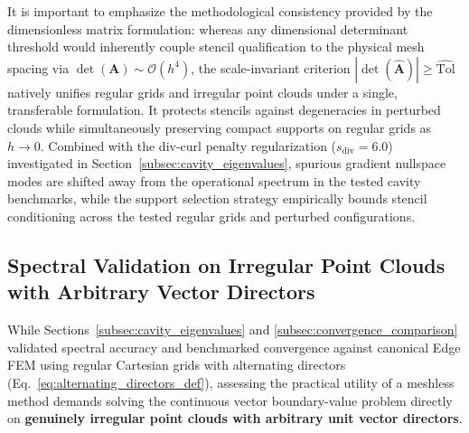 \documentclass[preprint,12pt]{elsarticle}
\begin{document}
It is important to emphasize the methodological consistency provided by the dimensionless matrix formulation: whereas any dimensional determinant threshold would inherently couple stencil qualification to the physical mesh spacing via $\det(\mathbf{A}) \sim \mathcal{O}(h^4)$, the scale-invariant criterion $|\det(\widehat{\mathbf{A}})| \ge \widehat{\mathrm{Tol}}$ natively unifies regular grids and irregular point clouds under a single, transferable formulation. It protects stencils against degeneracies in perturbed clouds while simultaneously preserving compact supports on regular grids as $h \to 0$. Combined with the div-curl penalty regularization ($s_{\mathrm{div}} = 6.0$) investigated in Section~\ref{subsec:cavity_eigenvalues}, spurious gradient nullspace modes are shifted away from the operational spectrum in the tested cavity benchmarks, while the support selection strategy empirically bounds stencil conditioning across the tested regular grids and perturbed configurations.

\subsection{Spectral Validation on Irregular Point Clouds with Arbitrary Vector Directors}
\label{subsec:spectral_irregular_clouds}

While Sections~\ref{subsec:cavity_eigenvalues} and \ref{subsec:convergence_comparison} validated spectral accuracy and benchmarked convergence against canonical Edge FEM using regular Cartesian grids with alternating directors (Eq.~\eqref{eq:alternating_directors_def}), assessing the practical utility of a meshless method demands solving the continuous vector boundary-value problem directly on \textbf{genuinely irregular point clouds with arbitrary unit vector directors}.
\end{document}
